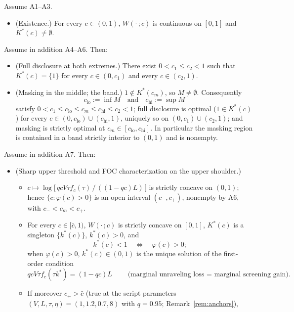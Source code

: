 \begin{proposition}\label{prop:band}
Assume A1--A3.
\begin{itemize}
\item[\textup{(a)}] \textup{(Existence.)} For every $c \in (0,1)$, $W(\cdot\,; c)$ is
continuous on $[0,1]$ and $K^*(c) \neq \emptyset$.
\end{itemize}
Assume in addition A4--A6. Then:
\begin{itemize}
\item[\textup{(b)}] \textup{(Full disclosure at both extremes.)} There exist
$0 < c_1 \le c_2 < 1$ such that $K^*(c) = \{1\}$ for every $c \in (0, c_1)$ and every
$c \in (c_2, 1)$.
\item[\textup{(c)}] \textup{(Masking in the middle; the band.)} $1 \notin K^*(c_m)$, so
$M \neq \emptyset$. Consequently
\[
c_{\mathrm{lo}} := \inf M \quad\text{and}\quad c_{\mathrm{hi}} := \sup M
\]
satisfy $0 < c_1 \le c_{\mathrm{lo}} \le c_m \le c_{\mathrm{hi}} \le c_2 < 1$; full
disclosure is optimal ($1 \in K^*(c)$) for every
$c \in (0, c_{\mathrm{lo}}) \cup (c_{\mathrm{hi}}, 1)$, uniquely so on
$(0, c_1) \cup (c_2, 1)$; and masking is strictly optimal at
$c_m \in [c_{\mathrm{lo}}, c_{\mathrm{hi}}]$. In particular the masking region is
contained in a band strictly interior to $(0,1)$ and is nonempty.
\end{itemize}
Assume in addition A7. Then:
\begin{itemize}
\item[\textup{(d)}] \textup{(Sharp upper threshold and FOC characterization on the
upper shoulder.)}
\begin{itemize}
\item[\textup{(d1)}] $c \mapsto \log\bigl[\, qcV\tau f_c(\tau) \,/\, ((1-qc)L) \,\bigr]$
is strictly concave on $(0,1)$; hence $\{c : \varphi(c) > 0\}$ is an open interval
$(c_-, c_+)$, nonempty by A6, with $c_- < c_m < c_+$.
\item[\textup{(d2)}] For every $c \in [\bar c, 1)$, $W(\cdot\,; c)$ is strictly concave
on $[0,1]$, $K^*(c)$ is a singleton $\{k^*(c)\}$, $k^*(c) > 0$, and
\[
k^*(c) < 1 \quad\iff\quad \varphi(c) > 0;
\]
when $\varphi(c) > 0$, $k^*(c) \in (0,1)$ is the unique solution of the first-order
condition
\[
qcV\tau f_c(\tau k^*) = (1 - qc)L
\qquad \text{(marginal unraveling loss $=$ marginal screening gain).}
\]
\item[\textup{(d3)}] If moreover $c_+ > \bar c$ (true at the script parameters
$(V, L, \tau, \eta) = (1, 1.2, 0.7, 8)$ with $q = 0.95$; Remark~\ref{rem:anchors}),

\end{itemize}
\end{itemize}
\end{proposition}
